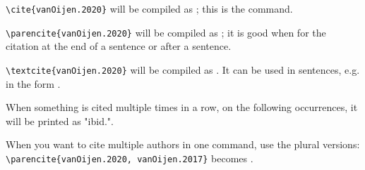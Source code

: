 \documentclass[../Main.tex]{subfiles}
\begin{document}
\texttt{\textbackslash cite\{vanOijen.2020\}} will be compiled as \cite{vanOijen.2020}; this is the  command.

\texttt{\textbackslash parencite\{vanOijen.2020\}} will be compiled as \parencite{vanOijen.2020}; it is good when for the  citation at the end of a sentence or after a sentence.

\texttt{\textbackslash textcite\{vanOijen.2020\}} will be compiled as \textcite{vanOijen.2020}. It can be used in sentences, e.g. in the form .

When something is cited multiple times in a row, on the following occurrences, it will be printed as "ibid.".

When you want to cite multiple authors in one command, use the plural versions: \texttt{\textbackslash parencite\{vanOijen.2020, vanOijen.2017\}} becomes \parencite{vanOijen.2020, vanOijen.2017}. 
\end{document}

